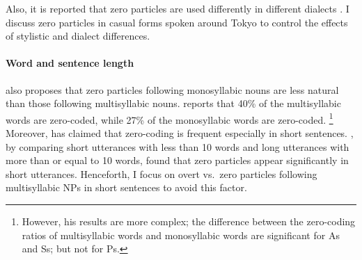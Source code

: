 %
%
Also, it is reported that
zero particles are used differently in different dialects \cite[e.g.,][]{sasaki06,nakagawa13m}.
%
I discuss zero particles in casual forms spoken around Tokyo
to control the effects of stylistic and dialect differences.

\paragraph{Word and sentence length}

 also proposes that
zero particles following monosyllabic nouns are less natural than
those following multisyllabic nouns.
%
 reports that
40\% of the multisyllabic words are zero-coded,
while 27\% of the monosyllabic words are zero-coded.%
 \footnote{
 However, his results are more complex;
 the difference between the zero-coding ratios of multisyllabic words
 and monosyllabic words are significant for As and Ss;
 but not for Ps.
 }
Moreover,
 has claimed that
zero-coding is frequent especially in short sentences.
,
by comparing short utterances with less than 10 words and
long utterances with more than or equal to 10 words,
found that zero particles appear significantly in short utterances.
%
Henceforth, I focus on overt vs.~zero particles following multisyllabic NPs in short sentences to avoid this factor.

